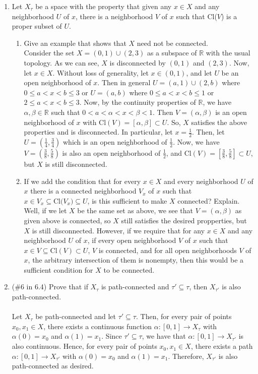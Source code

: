 \documentclass[12pt]{article}
\begin{document}
\begin{enumerate}
\item Let $X_{\tau}$ be a space with the property that given any $x\in X$ and any neighborhood $U$ of $x$, there is a neighborhood $V$ of $x$ such that Cl($V$) is a proper subset of $U$. 
\begin{enumerate}
\item Give an example that shows that $X$ need not be connected.\\
Consider the set $X=(0,1)\cup(2,3)$ as a subspace of $\mathbb{R}$ with the usual topology. As we can see, $X$ is disconnected by $(0,1)$ and $(2,3)$. Now, let $x\in X$. Without loss of generality, let $x\in(0,1)$, and let $U$ be an open neighborhood of $x$. Then in general $U=(a,1)\cup(2,b)$ where $0\leq a<x<b\leq3$ or $U=(a,b)$ where $0\leq a<x<b\leq1$ or $2\leq a<x<b\leq3$. Now, by the continuity properties of $\mathbb{R}$, we have $\alpha,\beta\in\mathbb{R}$ such that $0<a<\alpha<x<\beta<1$. Then $V=(\alpha,\beta)$ is an open neighborhood of $x$ with Cl$(V)=[\alpha,\beta]\subset U$. So, $X$ satisfies the above properties and is disconnected. In particular, let $x=\frac12$. Then, let $U=(\frac14,\frac34)$ which is an open neighborhood of $\frac12$. Now, we have $V=(\frac38,\frac58)$ is also an open neighborhood of $\frac12$, and Cl$(V)=[\frac38,\frac58]\subset U$, but $X$ is still disconnected.\\
\item If we add the condition that for every $x\in X$ and every neighborhood $U$ of $x$ there is a connected neighborhood $V_x$ of $x$ such that $x\in V_x\subseteq \text{Cl($V_x$)}\subseteq U$, is this sufficient to make $X$ connected? Explain.\\
Well, if we let $X$ be the same set as above, we see that $V=(\alpha,\beta)$ as given above is connected, so $X$ still satisfies the desired propperties, but $X$ is still disconnected. However, if we require that for any $x\in X$ and any neighborhood $U$ of $x$, if every open neighborhood $V$ of $x$ such that $x\in V\subseteq$Cl$(V)\subset U$, $V$ is connected, and for all open neighborhoods $V$ of $x$, the arbitrary intersection of them is nonempty, then this would be a sufficient condition for $X$ to be connected.\\
\end{enumerate}

\item(\#6 in 6.4) Prove that if $X_{\tau}$ is path-connected and $\tau' \subseteq \tau$, then $X_{\tau'}$ is also path-connected.\\\\
Let $X_{\tau}$ be path-connected and let $\tau'\subseteq\tau$. Then, for every pair of points $x_0,x_1\in X$, there exists a continuous function $\alpha:[0,1]\rightarrow X_{\tau}$ with $\alpha(0)=x_0$ and $\alpha(1)=x_1$. Since $\tau'\subseteq\tau$, we have that $\alpha:[0,1]\rightarrow X_{\tau'}$ is also continuous. Hence, for every pair of points $x_0,x_1\in X$, there exists a path $\alpha:[0,1]\rightarrow X_{\tau'}$ with $\alpha(0)=x_0$ and $\alpha(1)=x_1$. Therefore, $X_{\tau'}$ is also path-connected as desired.\\


\end{enumerate}
\end{document}
